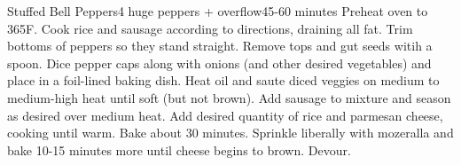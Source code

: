 \begin{recipe}{Stuffed Bell Peppers}{4 huge peppers + overflow}{45-60 minutes}
  Preheat oven to 365\0F.
  Cook rice and sausage according to directions, draining all fat.
  Trim bottoms of peppers so they stand straight. Remove tops and gut seeds
  witih a spoon. Dice pepper caps along with onions (and other desired
  vegetables) and place in a foil-lined baking dish.
  Heat oil and saute diced veggies on medium to medium-high heat until soft
  (but not brown). Add sausage to mixture and season as desired over medium
  heat. Add desired quantity of rice and parmesan cheese, cooking until warm.
  Bake about 30 minutes. Sprinkle liberally with mozeralla and bake 10-15
  minutes more until cheese begins to brown. Devour.
\end{recipe}
